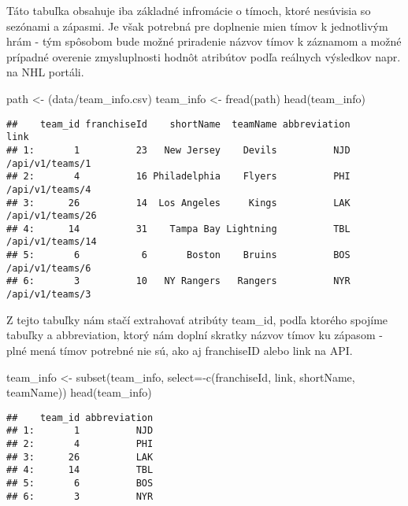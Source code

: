 \documentclass[
]{article}
\newenvironment{Shaded}{\begin{snugshade}}{\end{snugshade}}
\newcommand{\AttributeTok}[1]{\textcolor[rgb]{0.77,0.63,0.00}{#1}}
\newcommand{\FunctionTok}[1]{\textcolor[rgb]{0.00,0.00,0.00}{#1}}
\newcommand{\NormalTok}[1]{#1}
\newcommand{\OtherTok}[1]{\textcolor[rgb]{0.56,0.35,0.01}{#1}}
\newcommand{\SpecialCharTok}[1]{\textcolor[rgb]{0.00,0.00,0.00}{#1}}
\newcommand{\StringTok}[1]{\textcolor[rgb]{0.31,0.60,0.02}{#1}}
\begin{document}
Táto tabuľka obsahuje iba základné infromácie o tímoch, ktoré nesúvisia
so sezónami a zápasmi. Je však potrebná pre doplnenie mien tímov k
jednotlivým hrám - tým spôsobom bude možné priradenie názvov tímov k
záznamom a možné prípadné overenie zmysluplnosti hodnôt atribútov podľa
reálnych výsledkov napr. na NHL portáli.

\begin{Shaded}
\begin{Highlighting}[]
\NormalTok{path }\OtherTok{\textless{}{-}}\NormalTok{ (}\StringTok{\textquotesingle{}data/team\_info.csv\textquotesingle{}}\NormalTok{)}
\NormalTok{team\_info }\OtherTok{\textless{}{-}} \FunctionTok{fread}\NormalTok{(path)}
\FunctionTok{head}\NormalTok{(team\_info)}
\end{Highlighting}
\end{Shaded}

\begin{verbatim}
##    team_id franchiseId    shortName  teamName abbreviation             link
## 1:       1          23   New Jersey    Devils          NJD  /api/v1/teams/1
## 2:       4          16 Philadelphia    Flyers          PHI  /api/v1/teams/4
## 3:      26          14  Los Angeles     Kings          LAK /api/v1/teams/26
## 4:      14          31    Tampa Bay Lightning          TBL /api/v1/teams/14
## 5:       6           6       Boston    Bruins          BOS  /api/v1/teams/6
## 6:       3          10   NY Rangers   Rangers          NYR  /api/v1/teams/3
\end{verbatim}

Z tejto tabuľky nám stačí extrahovať atribúty team\_id, podľa ktorého
spojíme tabuľky a abbreviation, ktorý nám doplní skratky názvov tímov ku
zápasom - plné mená tímov potrebné nie sú, ako aj franchiseID alebo link
na API.

\begin{Shaded}
\begin{Highlighting}[]
\NormalTok{team\_info }\OtherTok{\textless{}{-}} \FunctionTok{subset}\NormalTok{(team\_info, }\AttributeTok{select=}\SpecialCharTok{{-}}\FunctionTok{c}\NormalTok{(franchiseId, link, shortName, teamName))}
\FunctionTok{head}\NormalTok{(team\_info)}
\end{Highlighting}
\end{Shaded}

\begin{verbatim}
##    team_id abbreviation
## 1:       1          NJD
## 2:       4          PHI
## 3:      26          LAK
## 4:      14          TBL
## 5:       6          BOS
## 6:       3          NYR
\end{verbatim}
\end{document}
